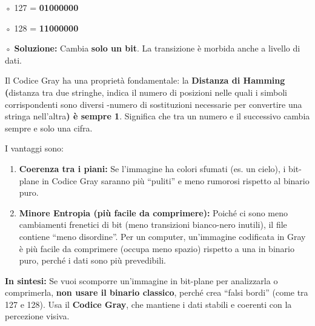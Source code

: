 \documentclass[
]{article}
\begin{document}
◦ 127 = \textbf{01000000}

◦ 128 = \textbf{11000000}

◦ \textbf{Soluzione:} Cambia \textbf{solo un bit}. La transizione è morbida anche a livello di dati.

Il Codice Gray ha una proprietà fondamentale: la \textbf{Distanza di Hamming (}distanza tra due stringhe, indica il numero di posizioni nelle quali i
simboli corrispondenti sono diversi
-numero di sostituzioni necessarie per convertire una stringa nell'altra\textbf{) è sempre 1}. Significa che tra un numero e il successivo cambia sempre e solo una cifra.

I vantaggi sono:

\begin{enumerate}
\def\labelenumi{\arabic{enumi}.}
\item
  \textbf{Coerenza tra i piani:} Se l'immagine ha colori sfumati (es. un cielo), i bit-plane in Codice Gray saranno più ``puliti'' e meno rumorosi rispetto al binario puro.
\item
  \textbf{Minore Entropia (più facile da comprimere):} Poiché ci sono meno cambiamenti frenetici di bit (meno transizioni bianco-nero inutili), il file contiene ``meno disordine''. Per un computer, un'immagine codificata in Gray è più facile da comprimere (occupa meno spazio) rispetto a una in binario puro, perché i dati sono più prevedibili.
\end{enumerate}

\textbf{In sintesi:} Se vuoi scomporre un'immagine in bit-plane per analizzarla o comprimerla, \textbf{non usare il binario classico}, perché crea ``falsi bordi'' (come tra 127 e 128). Usa il \textbf{Codice Gray}, che mantiene i dati stabili e coerenti con la percezione visiva.
\end{document}
